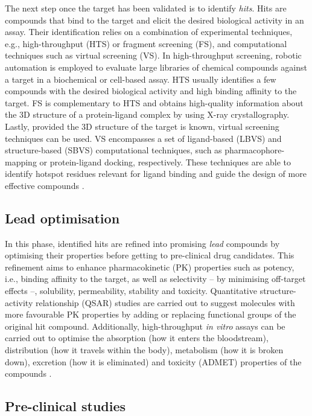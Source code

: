 The next step once the target has been validated is to identify \textit{hits}. Hits are compounds that bind to the target and elicit the desired biological activity in an assay. Their identification relies on a combination of experimental techniques, e.g., high-throughput (HTS) or fragment screening (FS), and computational techniques such as virtual screening (VS). In high-throughput screening, robotic automation is employed to evaluate large libraries of chemical compounds against a target in a biochemical or cell-based assay. HTS usually identifies a few compounds with the desired biological activity and high binding affinity to the target. FS is complementary to HTS and obtains high-quality information about the 3D structure of a protein-ligand complex by using X-ray crystallography. Lastly, provided the 3D structure of the target is known, virtual screening techniques can be used. VS encompasses a set of ligand-based (LBVS) and structure-based (SBVS) computational techniques, such as pharmacophore-mapping or protein-ligand docking, respectively. These techniques are able to identify hotspot residues relevant for ligand binding and guide the design of more effective compounds \cite{SINHA_2018_DD}.

\subsection{Lead optimisation}

In this phase, identified hits are refined into promising \textit{lead} compounds by optimising their properties before getting to pre-clinical drug candidates. This refinement aims to enhance pharmacokinetic (PK) properties such as potency, i.e., binding affinity to the target, as well as selectivity -- by minimising off-target effects --, solubility, permeability, stability and toxicity. Quantitative structure-activity relationship (QSAR) studies are carried out to suggest molecules with more favourable PK properties by adding or replacing functional groups of the original hit compound. Additionally, high-throughput \textit{in vitro} assays can be carried out to optimise the absorption (how it enters the bloodstream), distribution (how it travels within the body), metabolism (how it is broken down), excretion (how it is eliminated) and toxicity (ADMET) properties of the compounds \cite{SHOU_2020_ADME}.

\subsection{Pre-clinical studies}

